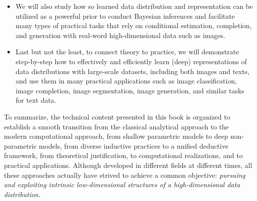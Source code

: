 \documentclass[../../book-main.tex]{subfiles}
\begin{document}
\begin{itemize}
\item We will also study how so learned data distribution and representation can be utilized as a powerful prior to conduct Bayesian inferences and facilitate many types of practical tasks that rely on conditional estimation, completion, and generation with real-word high-dimensional data such as images. 

\item Last but not the least, to connect theory to practice, we will demonstrate step-by-step how to effectively and efficiently learn (deep) representations of  data distributions with large-scale datasets, including both images and texts, and use them in many practical applications such as image classification, image completion, image segmentation, image generation, and similar tasks for text data. 
\end{itemize}

To summarize, the technical content presented in this book is organized to establish a smooth transition from the classical analytical approach to the modern computational approach, from shallow parametric models to deep non-parametric models, from diverse inductive practices to a unified deductive framework, from theoretical justification, to computational realizations, and to practical applications. Although developed in different fields at different times, all these approaches actually have strived to achieve a common objective: {\em pursuing and exploiting intrinsic low-dimensional structures of a high-dimensional data distribution.} 
\end{document}
